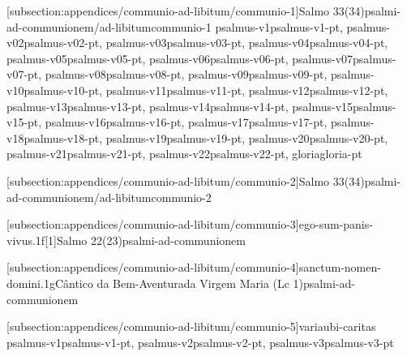 \def\Prefix{subsection:appendices/communio-ad-libitum}

[\Prefix/communio-1]{Salmo 33(34)}{psalmi-ad-communionem/ad-libitum}{communio-1}{
  {psalmus-v1}{psalmus-v1-pt},
  {psalmus-v02}{psalmus-v02-pt},
  {psalmus-v03}{psalmus-v03-pt},
  {psalmus-v04}{psalmus-v04-pt},
  {psalmus-v05}{psalmus-v05-pt},
  {psalmus-v06}{psalmus-v06-pt},
  {psalmus-v07}{psalmus-v07-pt},
  {psalmus-v08}{psalmus-v08-pt},
  {psalmus-v09}{psalmus-v09-pt},
  {psalmus-v10}{psalmus-v10-pt},
  {psalmus-v11}{psalmus-v11-pt},
  {psalmus-v12}{psalmus-v12-pt},
  {psalmus-v13}{psalmus-v13-pt},
  {psalmus-v14}{psalmus-v14-pt},
  {psalmus-v15}{psalmus-v15-pt},
  {psalmus-v16}{psalmus-v16-pt},
  {psalmus-v17}{psalmus-v17-pt},
  {psalmus-v18}{psalmus-v18-pt},
  {psalmus-v19}{psalmus-v19-pt},
  {psalmus-v20}{psalmus-v20-pt},
  {psalmus-v21}{psalmus-v21-pt},
  {psalmus-v22}{psalmus-v22-pt},
  {gloria}{gloria-pt}
}

\AllowPageFlush

[\Prefix/communio-2]{Salmo 33(34)}{psalmi-ad-communionem/ad-libitum}{communio-2}

\AllowPageFlush

[\Prefix/communio-3]{ego-sum-panis-vivus.1f}[1]{Salmo 22(23)}{psalmi-ad-communionem}

\AllowPageFlush

[\Prefix/communio-4]{sanctum-nomen-domini.1g}{Cântico da Bem-Aventurada Virgem Maria (Lc 1)}{psalmi-ad-communionem}

\AllowPageFlush

[\Prefix/communio-5]{}{varia}{ubi-caritas}{
  {psalmus-v1}{psalmus-v1-pt},
  {psalmus-v2}{psalmus-v2-pt},
  {psalmus-v3}{psalmus-v3-pt}
}